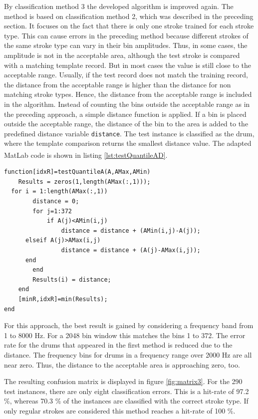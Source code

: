 By classification method 3 the developed algorithm is improved again. The method is based on classification method 2, which was described in the preceding section. It focuses on the fact that there is only one stroke trained for each stroke type. This can cause errors in the preceding method because different strokes of the same stroke type can vary in their bin amplitudes. Thus, in some cases, the amplitude is not in the acceptable area, although the test stroke is compared with a matching template record. But in most cases the value is still close to the acceptable range. Usually, if the test record does not match the training record, the distance from the acceptable range is higher than the distance for non matching stroke types. Hence, the distance from the acceptable range is included in the algorithm. Instead of counting the bins outside the acceptable range as in the preceding approach, a simple distance function is applied. If a bin is placed outside the acceptable range, the distance of the bin to the area is added to the predefined distance variable \lstinline{distance}. The test instance is classified as the drum, where the template comparison returns the smallest distance value. The adapted MatLab\textsuperscript{\textregistered} code is shown in listing \ref{lst:testQuantileAD}.

\begin{lstlisting}[caption={testQuantileAD},label={lst:testQuantileAD}]
function[idxR]=testQuantileA(A,AMax,AMin)
	Results = zeros(1,length(AMax(:,1)));    
  for i = 1:length(AMax(:,1))
		distance = 0;  
		for j=1:372
			if A(j)<AMin(i,j)
				distance = distance + (AMin(i,j)-A(j));
      elseif A(j)>AMax(i,j)
				distance = distance + (A(j)-AMax(i,j));			
      end
		end
		Results(i) = distance; 
	end
	[minR,idxR]=min(Results);
end
\end{lstlisting}


For this approach, the best result is gained by considering a frequency band from 1 to 8000 Hz. For a 2048 bin window this matches the bins 1 to 372. The error rate for the drums that appeared in the first method is reduced due to the distance. The frequency bins for drums in a frequency range over 2000 Hz are all near zero. Thus, the distance to the acceptable area is approaching zero, too.

The resulting confusion matrix is displayed in figure \ref{fig:matrix3}. For the 290 test instances, there are only eight classification errors. This is a hit-rate of 97.2 \%, whereas 70.3 \% of the instances are classified with the correct stroke type. If only regular strokes are considered this method reaches a hit-rate of 100 \%. 

